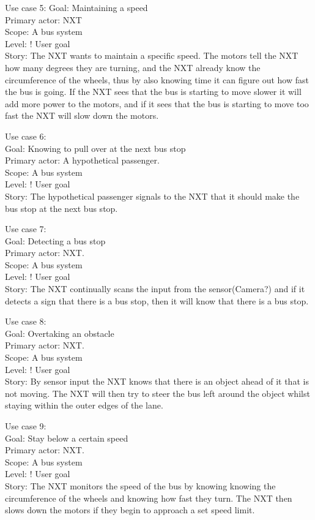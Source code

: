 Use case 5:
Goal: Maintaining a speed\\
Primary actor: NXT\\
Scope: A bus system\\
Level: ! User goal\\
Story: The NXT wants to maintain a specific speed. The motors tell the NXT how many degrees they are turning, and the NXT already know the circumference of the wheels, thus by also knowing time it can figure out how fast the bus is going. If the NXT sees that the bus is starting to move slower it will add more power to the motors, and if it sees that the bus is starting to move too fast the NXT will slow down the motors.

Use case 6:\\
Goal: Knowing to pull over at the next bus stop\\
Primary actor: A hypothetical passenger.\\
Scope: A bus system\\
Level: ! User goal\\
Story: The hypothetical passenger signals to the NXT that it should make the bus stop at the next bus stop.

Use case 7:\\
Goal: Detecting a bus stop\\
Primary actor: NXT.\\
Scope: A bus system\\
Level: ! User goal\\
Story: The NXT continually scans the input from the sensor(Camera?) and if it detects a sign that there is a bus stop, then it will know that there is a bus stop.

Use case 8:\\
Goal: Overtaking an obstacle\\
Primary actor: NXT.\\
Scope: A bus system\\
Level: ! User goal\\
Story: By sensor input the NXT knows that there is an object ahead of it that is not moving. The NXT will then try to steer the bus left around the object whilst staying within the outer edges of the lane.

Use case 9:\\
Goal: Stay below a certain speed\\
Primary actor: NXT.\\
Scope: A bus system\\
Level: ! User goal\\
Story: The NXT monitors the speed of the bus by knowing knowing the circumference of the wheels and knowing how fast they turn. The NXT then slows down the motors if they begin to approach a set speed limit.

